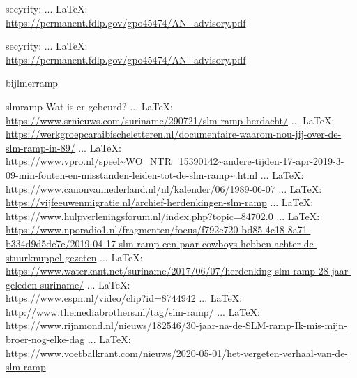 \begin{thebibliography}{99}
{{{	
	secyrity:
	 ... \LaTeX:\\ \url{https://permanent.fdlp.gov/gpo45474/AN_advisory.pdf}
	
	
	secyrity:
	 ... \LaTeX:\\ \url{https://permanent.fdlp.gov/gpo45474/AN_advisory.pdf}
	
	
	
	
	
	
	
	
	bijlmerramp
	
	
	
	
	slmramp
	Wat is er gebeurd?
	 ... \LaTeX:\\ \url{https://www.srnieuws.com/suriname/290721/slm-ramp-herdacht/}
	 ... \LaTeX:\\ \url{https://werkgroepcaraibischeletteren.nl/documentaire-waarom-nou-jij-over-de-slm-ramp-in-89/}
	 ... \LaTeX:\\ \url{https://www.vpro.nl/speel~WO_NTR_15390142~andere-tijden-17-apr-2019-3-09-min-fouten-en-misstanden-leiden-tot-de-slm-ramp~.html}
	 ... \LaTeX:\\ \url{https://www.canonvannederland.nl/nl/kalender/06/1989-06-07}
	 ... \LaTeX:\\ \url{https://vijfeeuwenmigratie.nl/archief-herdenkingen-slm-ramp}
	 ... \LaTeX:\\ \url{https://www.hulpverleningsforum.nl/index.php?topic=84702.0}
	 ... \LaTeX:\\ \url{https://www.nporadio1.nl/fragmenten/focus/f792e720-bd85-4c18-8a71-b334d9d5de7e/2019-04-17-slm-ramp-een-paar-cowboys-hebben-achter-de-stuurknuppel-gezeten}
	 ... \LaTeX:\\ \url{https://www.waterkant.net/suriname/2017/06/07/herdenking-slm-ramp-28-jaar-geleden-suriname/}
	 ... \LaTeX:\\ \url{https://www.espn.nl/video/clip?id=8744942}
	 ... \LaTeX:\\ \url{http://www.themediabrothers.nl/tag/slm-ramp/}
	 ... \LaTeX:\\ \url{https://www.rijnmond.nl/nieuws/182546/30-jaar-na-de-SLM-ramp-Ik-mis-mijn-broer-nog-elke-dag}
	 ... \LaTeX:\\ \url{https://www.voetbalkrant.com/nieuws/2020-05-01/het-vergeten-verhaal-van-de-slm-ramp}
}}}
\end{thebibliography}
